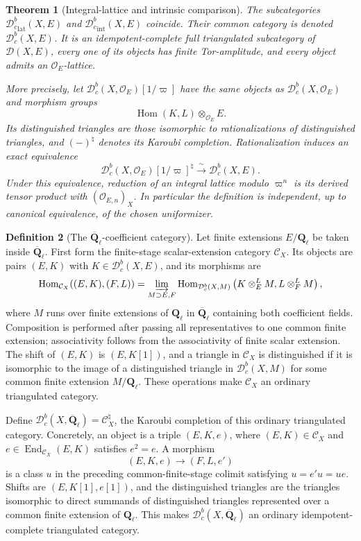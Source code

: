 \documentclass[10pt]{article}
\newtheorem{theorem}{Theorem}[section]
\theoremstyle{definition}
\newtheorem{definition}[theorem]{Definition}
\newcommand{\Ql}{\mathbf Q_\ell}
\newcommand{\Qlb}{\overline{\mathbf Q}_\ell}
\newcommand{\OO}{\mathcal O}
\newcommand{\Db}{\mathcal D}
\newcommand{\Dbc}{\mathcal D^b_c}
\begin{document}
\begin{theorem}[Integral-lattice and intrinsic comparison]
The subcategories \({\Dbc}_{\mathrm{lat}}(X,E)\) and
\({\Dbc}_{\mathrm{int}}(X,E)\) coincide.  Their common category is denoted
\(\Dbc(X,E)\).  It is an idempotent-complete full triangulated subcategory
of \(\Db(X,E)\), every one of its objects has finite Tor-amplitude, and
every object admits an \(\OO_E\)-lattice.

More precisely, let \(\Dbc(X,\OO_E)[1/\varpi]\) have the same objects as
\(\Dbc(X,\OO_E)\) and morphism groups
\[
 \operatorname{Hom}(K,L)\otimes_{\OO_E}E.
\]
Its distinguished triangles are those isomorphic to rationalizations of
distinguished triangles, and \((-)^\natural\) denotes its Karoubi
completion.  Rationalization induces an exact equivalence
\[
 \Dbc(X,\OO_E)[1/\varpi]^\natural
 \xrightarrow{\ \sim\ }\Dbc(X,E).
\]
Under this equivalence, reduction of an integral lattice modulo
\(\varpi^n\) is its derived tensor product with
\((\OO_{E,n})_X\).  In particular the definition is independent, up to
canonical equivalence, of the chosen uniformizer.
\end{theorem}

\begin{definition}[The \(\Qlb\)-coefficient category]
Let finite extensions \(E/\Ql\) be taken inside \(\Qlb\).  First form the
finite-stage scalar-extension category \(\mathcal C_X\).  Its objects are
pairs \((E,K)\) with \(K\in\Dbc(X,E)\), and its morphisms are
\[
 \operatorname{Hom}_{\mathcal C_X}((E,K),(F,L))
 =\varinjlim_{M\supset E,F}
 \operatorname{Hom}_{\Dbc(X,M)}
 \left(K\otimes_E^LM,L\otimes_F^LM\right),
\]
where \(M\) runs over finite extensions of \(\Ql\) in \(\Qlb\) containing
both coefficient fields.  Composition is performed after passing all
representatives to one common finite extension; associativity follows from
the associativity of finite scalar extension.  The shift of \((E,K)\) is
\((E,K[1])\), and a triangle in \(\mathcal C_X\) is distinguished if it is
isomorphic to the image of a distinguished triangle in \(\Dbc(X,M)\) for
some common finite extension \(M/\Ql\).  These operations make
\(\mathcal C_X\) an ordinary triangulated category.

Define \(\Dbc(X,\Qlb)=\mathcal C_X^\natural\), the Karoubi completion of
this ordinary triangulated category.  Concretely, an object is a triple
\((E,K,e)\), where \((E,K)\in\mathcal C_X\) and
\(e\in\operatorname{End}_{\mathcal C_X}(E,K)\) satisfies \(e^2=e\).  A
morphism
\[
 (E,K,e)\longrightarrow(F,L,e')
\]
is a class \(u\) in the preceding common-finite-stage colimit satisfying
\(u=e'u=ue\).  Shifts are \((E,K[1],e[1])\), and the distinguished
triangles are the triangles isomorphic to direct summands of distinguished
triangles represented over a common finite extension of \(\Ql\).  This makes
\(\Dbc(X,\Qlb)\) an ordinary idempotent-complete triangulated category.
\end{definition}
\end{document}
